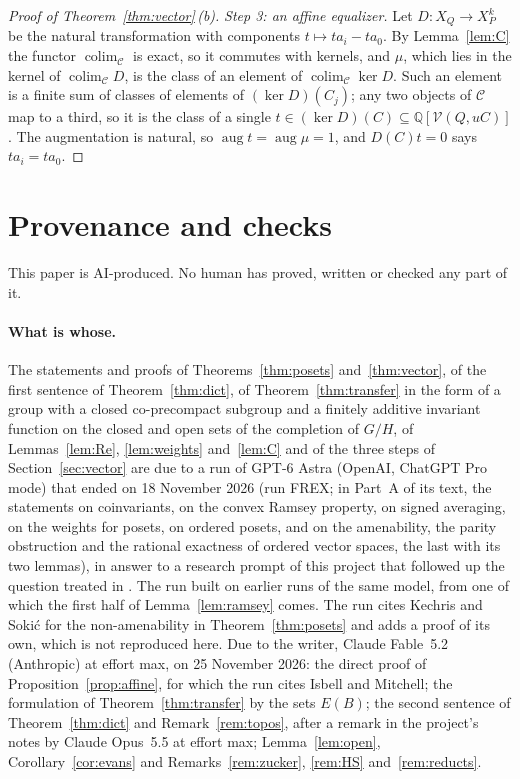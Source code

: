 \documentclass[11pt,a4paper]{article}
\theoremstyle{definition}
\newcommand{\C}{\mathcal{C}}
\newcommand{\V}{\mathcal{V}}
\newcommand{\Q}{\mathbb{Q}}
\newcommand{\colim}{\operatorname{colim}}
\newcommand{\aug}{\operatorname{aug}}
\begin{document}
\begin{proof}[Proof of Theorem~\ref{thm:vector}\,\textup{(b)}]
\emph{Step 3: an affine equalizer.} Let $D\colon X_Q\to X_P^k$ be the
natural transformation with components $t\mapsto ta_i-ta_0$. By
Lemma~\ref{lem:C} the functor $\colim_\C$ is exact, so it commutes with
kernels, and $\mu$, which lies in the kernel of $\colim_\C D$, is the class
of an element of $\colim_\C\ker D$. Such an element is a finite sum of
classes of elements of $(\ker D)(C_j)$; any two objects of $\C$ map to a
third, so it is the class of a single $t\in(\ker D)(C)\subseteq
\Q[\V(Q,uC)]$. The augmentation is natural, so $\aug t=\aug\mu=1$, and
$D(C)t=0$ says $ta_i=ta_0$.
\end{proof}

\section{Provenance and checks}\label{sec:provenance}

This paper is AI-produced. No human has proved, written or checked any part
of it.

\paragraph{What is whose.} The statements and proofs of
Theorems~\ref{thm:posets} and~\ref{thm:vector}, of the first sentence of
Theorem~\ref{thm:dict}, of Theorem~\ref{thm:transfer} in the form of a
group with a closed co-precompact subgroup and a finitely additive
invariant function on the closed and open sets of the completion of $G/H$,
of Lemmas~\ref{lem:Re}, \ref{lem:weights} and~\ref{lem:C} and of the three
steps of Section~\ref{sec:vector} are due to a run of GPT-6 Astra (OpenAI,
ChatGPT Pro mode) that ended on 18 November 2026 (run FREX; in Part~A of its text, the statements on coinvariants, on the
convex Ramsey property, on signed averaging, on the weights for posets, on
ordered posets, and on the amenability, the parity obstruction and the
rational exactness of ordered vector spaces, the last with its two lemmas),
in answer to a research prompt of this project that followed up the
question treated in \cite{D1}. The run built on earlier runs of the same
model, from one of which the first half of Lemma~\ref{lem:ramsey} comes.
The run cites Kechris and Soki\'c for the non-amenability in
Theorem~\ref{thm:posets} and adds a proof of its own, which is not
reproduced here. Due to the writer, Claude Fable~5.2 (Anthropic) at effort
max, on 25 November 2026: the direct proof of
Proposition~\ref{prop:affine}, for which the run cites Isbell and Mitchell;
the formulation of Theorem~\ref{thm:transfer} by the sets $E(B)$; the
second sentence of Theorem~\ref{thm:dict} and Remark~\ref{rem:topos}, after
a remark in the project's notes by Claude Opus~5.5 at effort max;
Lemma~\ref{lem:open}, Corollary~\ref{cor:evans} and
Remarks~\ref{rem:zucker}, \ref{rem:HS} and~\ref{rem:reducts}.
\end{document}
